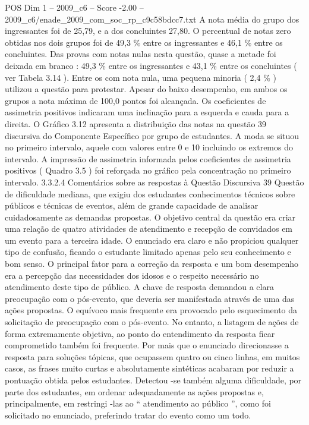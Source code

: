 \begin{textsample}{POS Dim 1 – 2009\_c6 – Score -2.00 – 2009\_c6/enade\_2009\_com\_soc\_rp\_c9c58bdcc7.txt}
A nota média do grupo dos ingressantes foi de 25,79, e a dos concluintes 27,80.
O percentual de notas zero obtidas nos dois grupos foi de 49,3 \% entre os ingressantes e 46,1 \% entre os concluintes.
Das provas com notas nulas nesta questão, quase a metade foi deixada em branco : 49,3 \% entre os ingressantes e 43,1 \% entre os concluintes ( ver Tabela 3.14 ).
Entre os com nota nula, uma pequena minoria ( 2,4 \% ) utilizou a questão para protestar.
Apesar do baixo desempenho, em ambos os grupos a nota máxima de 100,0 pontos foi alcançada.
Os coeficientes de assimetria positivos indicaram uma inclinação para a esquerda e cauda para a direita.
O Gráfico 3.12 apresenta a distribuição das notas na questão 39 discursiva do Componente Específico por grupo de estudantes.
A moda se situou no primeiro intervalo, aquele com valores entre 0 e 10 incluindo os extremos do intervalo.
A impressão de assimetria informada pelos coeficientes de assimetria positivos ( Quadro 3.5 ) foi reforçada no gráfico pela concentração no primeiro intervalo. 3.3.2.4 Comentários sobre as respostas à Questão Discursiva 39 Questão de dificuldade mediana, que exigiu dos estudantes conhecimentos técnicos sobre públicos e técnicas de eventos, além de grande capacidade de analisar cuidadosamente as demandas propostas.
O objetivo central da questão era criar uma relação de quatro atividades de atendimento e recepção de convidados em um evento para a terceira idade.
O enunciado era claro e não propiciou qualquer tipo de confusão, ficando o estudante limitado apenas pelo seu conhecimento e bom senso.
O principal fator para a correção da resposta e um bom desempenho era a percepção das necessidades dos idosos e o respeito necessário no atendimento deste tipo de público.
A chave de resposta demandou a clara preocupação com o pós-evento, que deveria ser manifestada através de uma das ações propostas.
O equívoco mais frequente era provocado pelo esquecimento da solicitação de preocupação com o pós-evento.
No entanto, a listagem de ações de forma extremamente objetiva, ao ponto do entendimento da resposta ficar comprometido também foi frequente.
Por mais que o enunciado direcionasse a resposta para soluções tópicas, que ocupassem quatro ou cinco linhas, em muitos casos, as frases muito curtas e absolutamente sintéticas acabaram por reduzir a pontuação obtida pelos estudantes.
Detectou -se também alguma dificuldade, por parte dos estudantes, em ordenar adequadamente as ações propostas e, principalmente, em restringi -las ao “ atendimento ao público ”, como foi solicitado no enunciado, preferindo tratar do evento como um todo.

\end{textsample}
